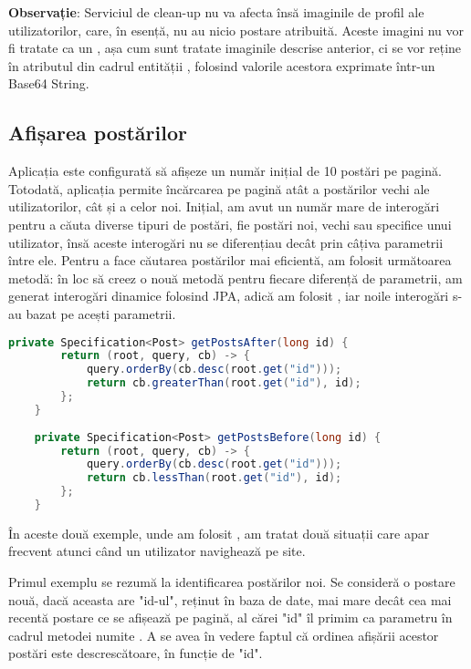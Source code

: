 \textbf{Observație}: Serviciul de clean-up nu va afecta însă imaginile de profil ale utilizatorilor, care, în esență, nu au nicio postare atribuită. Aceste imagini nu vor fi tratate ca un , așa cum sunt tratate imaginile descrise anterior, ci se vor reține în atributul  din cadrul entității , folosind valorile acestora exprimate într-un Base64 String.\newline

\subsection{Afișarea postărilor}

Aplicația este configurată să afișeze un număr inițial de 10 postări pe pagină. Totodată, aplicația permite încărcarea pe pagină atât a postărilor vechi ale utilizatorilor, cât și a celor noi. Inițial, am avut un număr mare de interogări pentru a căuta diverse tipuri de postări, fie postări noi, vechi sau specifice unui utilizator, însă aceste interogări nu se diferențiau decât prin câțiva parametrii între ele. Pentru a face căutarea postărilor mai eficientă, am folosit următoarea metodă: în loc să creez o nouă metodă pentru fiecare diferență de parametrii, am generat interogări dinamice folosind JPA\cite{.springjpa}, adică am folosit , iar noile interogări s-au bazat pe acești parametrii.\newline

\begin{lstlisting}[language=Java]
	    private Specification<Post> getPostsAfter(long id) {
		return (root, query, cb) -> {
			query.orderBy(cb.desc(root.get("id")));
			return cb.greaterThan(root.get("id"), id);
		};
	}
	
	private Specification<Post> getPostsBefore(long id) {
		return (root, query, cb) -> {
			query.orderBy(cb.desc(root.get("id")));
			return cb.lessThan(root.get("id"), id);
		};
	}
\end{lstlisting}
\bigskip

În aceste două exemple, unde am folosit , am tratat două situații care apar frecvent atunci când un utilizator navighează pe site.\newline 

Primul exemplu se rezumă la identificarea postărilor noi. Se consideră o postare nouă, dacă aceasta are "id-ul", reținut în baza de date, mai mare decât cea mai recentă postare ce se afișează pe pagină, al cărei "id" îl primim ca parametru în cadrul metodei numite . A se avea în vedere faptul că ordinea afișării acestor postări este descrescătoare, în funcție de "id".\newline

